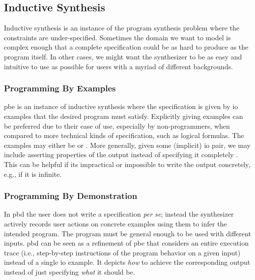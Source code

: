\subsection{Inductive Synthesis}
\label{sec:inductive}


Inductive synthesis is an instance of the program synthesis problem where the
constraints are under-specified. Sometimes the domain we want to model is
complex enough that a complete specification could be as hard to produce as the
program itself. In other cases, we might want the synthesizer to be as easy and
intuitive to use as possible for users with a myriad of different backgrounds.

\subsubsection{Programming By Examples}

\Gls{pbe} is an instance of inductive synthesis where the specification is given
by \gls{io} examples that the desired program must satisfy. Explicitly giving
examples can be preferred due to their ease of use, especially by
non-programmers, when compared to more technical kinds of specification, such as
logical formulas. The examples may either be  or . More generally, given some
(implicit) \gls{io} pair, we may include asserting properties of the output
instead of specifying it completely \cite{Gulwani2017, Polozov:2015:FFI}. This
can be helpful if its impractical or impossible to write the output concretely,
e.g., if it is infinite.

\subsubsection{Programming By Demonstration}


In \gls{pbd} the user does not write a specification \textit{per se}; instead the
synthesizer actively records user actions on concrete examples using them to
infer the intended program. The program must be general enough to be used
with different inputs. \gls{pbd} can be seen as a refinement of \gls{pbe} that
considers an entire execution trace (i.e., step-by-step instructions of the
program behavior on a given input) instead of a single \gls{io} example. It
depicts \textit{how} to achieve the corresponding output instead of just
specifying \textit{what} it should be.

